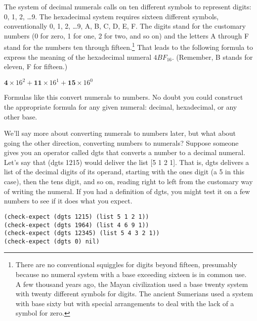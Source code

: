 The system of decimal numerals calls on ten different symbols to represent digits:
0, 1, 2, \dots 9.
The hexadecimal system requires sixteen different symbols, conventionally
0, 1, 2, \dots 9, A, B, C, D, E, F.
The digits stand for the customary numbers
(0 for zero, 1 for one, 2 for two, and so on)
and the letters A through F
stand for the numbers ten through fifteen.\footnote{There
are no conventional squiggles for digits beyond fifteen,
presumably because no numeral system
with a base exceeding sixteen is in common use.
A few thousand years ago, the Mayan civilization used a base twenty system
with twenty different symbols for digits.
The ancient Sumerians used a system with base sixty
but with special arrangements to deal with the lack of a symbol for zero.}
That leads to the following
formula to express the meaning of the hexadecimal numeral $4BF_{16}$.
(Remember, B stands for eleven, F for fifteen.)
\begin{center}
$\textbf{4} \times 16^2 + \textbf{11} \times 16^1 + \textbf{15} \times 16^0$
\end{center}
Formulas like this
convert numerals to numbers.
No doubt you could construct the appropriate formula
for any given numeral: decimal, hexadecimal, or any other base.

We'll say more about converting numerals to numbers later,
but what about going the other direction, converting
numbers to numerals?
Suppose someone gives you an operator called \textsf{dgts} that
converts a number to a decimal numeral.
Let's say that \textsf{(dgts 1215)} would deliver the list \textsf{[5 1 2 1]}.
That is, \textsf{dgts} delivers a list of the decimal digits
of its operand,
starting with the ones digit (a 5 in this case),
then the tens digit, and so on, reading right to left from
the customary way of writing the numeral.
If you had a definition of \textsf{dgts},
you might test it on a few numbers to see if it does what you expect.
\begin{code}
\begin{verbatim}
(check-expect (dgts 1215) (list 5 1 2 1))
(check-expect (dgts 1964) (list 4 6 9 1))
(check-expect (dgts 12345) (list 5 4 3 2 1))
(check-expect (dgts 0) nil)
\end{verbatim}
\end{code}


